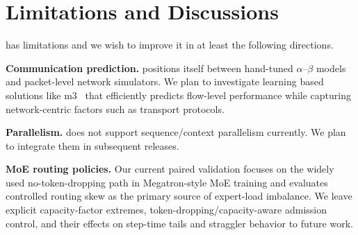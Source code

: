 
\section{Limitations and Discussions} 
\label{sec:discussion}

\noindent\sys has limitations and we wish to improve it in at least the following directions.

\noindent\textbf{Communication prediction.}
\sys positions itself between hand-tuned $\alpha$--$\beta$ models and packet-level network simulators.
We plan to investigate learning based solutions like m3~\cite{li2024m3} that efficiently predicts flow-level performance while capturing network-centric factors such as transport protocols. 

\noindent\textbf{Parallelism.}
\sys does not support sequence/context parallelism currently.
We plan to integrate them in subsequent releases.

\noindent\textbf{MoE routing policies.}
Our current paired validation focuses on the widely used no-token-dropping path in Megatron-style MoE training and evaluates controlled routing skew as the primary source of expert-load imbalance. 
We leave explicit capacity-factor extremes, token-dropping/capacity-aware admission control, and their effects on step-time tails and straggler behavior to future work.







